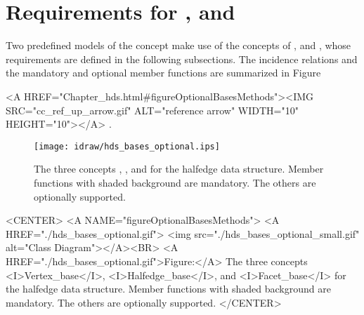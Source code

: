 \section{Requirements for \protect{},
  \protect{} and \protect{}}
\label{sectionHdsBases}

Two predefined models of the  concept
make use of the concepts of ,  and
, whose requirements are defined in the
following subsections. The incidence relations and the mandatory and
optional member functions are summarized in
Figure~\begin{ccHtmlOnly}
  <A HREF="Chapter_hds.html#figureOptionalBasesMethods"><IMG 
  SRC="cc_ref_up_arrow.gif" ALT="reference arrow" WIDTH="10" HEIGHT="10"></A>
.\end{ccHtmlOnly}

\begin{ccTexOnly}
    \begin{figure}
        \begin{center}
          \parbox{\textwidth}{%
              \texttt{[image: idraw/hds\_bases\_optional.ips]}%
          }
        \end{center}
        \caption{The three concepts \protect{}, 
          \protect{}, and 
          \protect{} for the halfedge data structure. Member
          functions with shaded background are mandatory. The others
          are optionally supported.}
        \label{figureOptionalBasesMethods}
    \end{figure}
\end{ccTexOnly}

\begin{ccHtmlOnly}
    <CENTER>
    <A NAME="figureOptionalBasesMethods">
    <A HREF="./hds_bases_optional.gif">
        <img src="./hds_bases_optional_small.gif" 
             alt="Class Diagram"></A><BR>
    <A HREF="./hds_bases_optional.gif">Figure:</A>
    The three concepts <I>Vertex_base</I>, <I>Halfedge_base</I>, and 
          <I>Facet_base</I> for the halfedge data structure. Member
          functions with shaded background are mandatory. The others
          are optionally supported.
    </CENTER>
\end{ccHtmlOnly}




